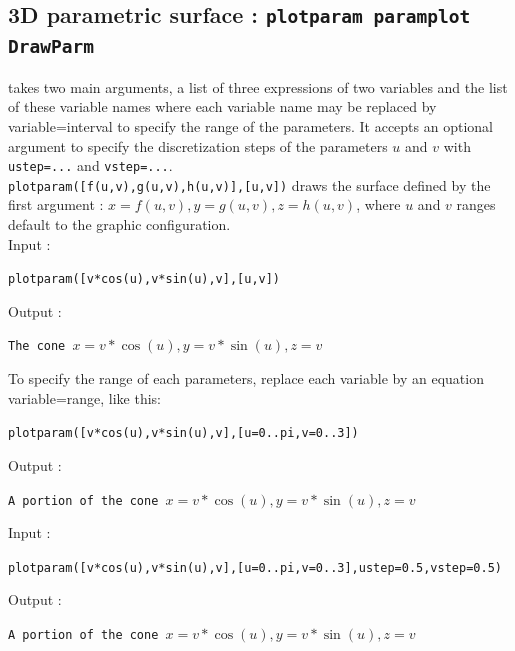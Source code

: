 \documentclass[a4paper,11pt]{book}
\begin{document}
\subsection{3D parametric surface : {\tt plotparam paramplot DrawParm}}
 takes two main arguments,
a list of three 
expressions of two variables and the list of these variable names
where each variable name may be replaced by variable=interval
to specify the range of the parameters.
It accepts an optional argument to specify
the discretization steps of the parameters $u$ and $v$ with 
{\tt ustep=...} and {\tt vstep=...}.\\
{\tt plotparam([f(u,v),g(u,v),h(u,v)],[u,v])} draws the surface defined by the 
first argument : $x=f(u,v),y=g(u,v),z=h(u,v)$, where $u$ and $v$
ranges default to the graphic configuration.\\
Input :
\begin{center}{\tt plotparam([v*cos(u),v*sin(u),v],[u,v])}\end{center}
Output :
\begin{center}{\tt The cone $x=v*\cos(u),y=v*\sin(u),z=v$}\end{center}
To specify the range of each parameters, replace each variable
by an equation variable=range, like this:
\begin{center}{\tt plotparam([v*cos(u),v*sin(u),v],[u=0..pi,v=0..3]) }\end{center}
Output :
\begin{center}{\tt A portion of the cone $x=v*\cos(u),y=v*\sin(u),z=v$}\end{center}
Input :
\begin{center}{\tt plotparam([v*cos(u),v*sin(u),v],[u=0..pi,v=0..3],ustep=0.5,vstep=0.5)}\end{center}
Output :
\begin{center}{\tt A portion of the cone $x=v*\cos(u),y=v*\sin(u),z=v$}\end{center}
 
\end{document}
